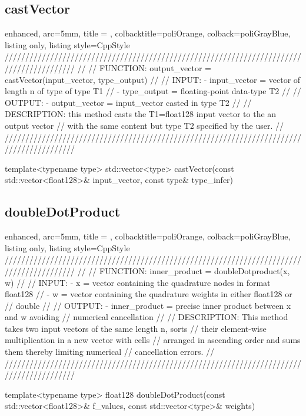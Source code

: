 \documentclass[a4paper, twosided]{book}
\begin{document}
\subsection[castVector]{\changefont castVector}\label{SubSec4.3.1}

\begin{tcblisting}{enhanced,
                   arc=5mm,
                   title = \color{black}{\large \ttfamily VecOps.cpp/castVector},
                   colbacktitle=poliOrange,
                   colback=poliGrayBlue,
                   listing only,
                   listing style=CppStyle}
/////////////////////////////////////////////////////////////////////////////////////////
//
//       FUNCTION: output_vector = castVector(input_vector, type_output)
//                
//          INPUT: - input_vector = vector of length n of type of type T1
//                 - type_output = floating-point data-type T2
//
//         OUTPUT: - output_vector = input_vector casted in type T2
//
//    DESCRIPTION: this method casts the T1=float128 input vector to the an output vector
//                 with the same content but type T2 specified by the user.
//
/////////////////////////////////////////////////////////////////////////////////////////

template<typename type>
std::vector<type> castVector(const std::vector<float128>& input_vector, const type& type_infer)
\end{tcblisting}

\subsection[doubleDotProduct]{\changefont doubleDotProduct}\label{SubSec4.3.2}

\begin{tcblisting}{enhanced,
                   arc=5mm,
                   title = \color{black}{\large \ttfamily Utils.cpp/doubleDotProduct},
                   colbacktitle=poliOrange,
                   colback=poliGrayBlue,
                   listing only,
                   listing style=CppStyle}
/////////////////////////////////////////////////////////////////////////////////////////
//
//       FUNCTION: inner_product = doubleDotproduct(x, w)
//                
//          INPUT: - x = vector containing the quadrature nodes in format float128
//                 - w = vector containing the quadrature weights in either float128 or 
//                       double
//
//         OUTPUT: - inner_product = precise inner product between x and w avoiding
//                                   numerical cancellation
//
//    DESCRIPTION: This method takes two input vectors of the same length n, sorts
//                 their element-wise multiplication in a new vector with cells
//                 arranged in ascending order and sums them thereby limiting numerical
//                 cancellation errors.
//
/////////////////////////////////////////////////////////////////////////////////////////

template<typename type>
float128 doubleDotProduct(const std::vector<float128>& f_values, const std::vector<type>& weights)
\end{tcblisting}
\end{document}
